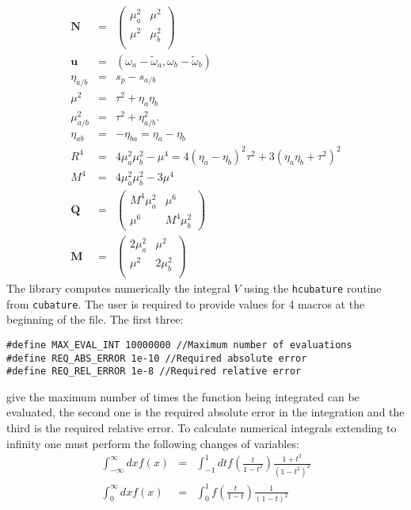 \documentclass[10pt,letterpaper]{article}
\begin{document}
\begin{eqnarray}\label{Nu}
\mathbf{N}&=& \left(
\begin{array}{cc}
\mu_a^2 & \mu^2 \\
\mu^2 & \mu_b^2 \\
\end{array}
\right)\\ 
\mathbf{u}&=&(\omega_a-\tilde \omega_a,\omega_b-\tilde \omega_b) \nonumber\\
\eta _{a/b}&=&s_p-s_{a/b} \nonumber\\
\mu ^2&=&\tau ^2+\eta _a \eta _b \nonumber\\
\mu _{a/b}^2&=&\tau ^2+\eta _{a/b}^2. \nonumber\\
\eta_{ab} &=&-\eta_{ba}=\eta _a-\eta _b \nonumber\\
R^4&=&4 \mu_a^2 \mu_b^2-\mu^4=4(\eta_a-\eta_b)^2 \tau^2+3 (\eta_a \eta_b+\tau^2)^2 \nonumber\\
M^4&=&4 \mu_a^2 \mu_b^2-3\mu^4\nonumber\\
\mathbf{Q}&=&
\left(
\begin{array}{cc}
M^4 \mu _a^2 & \mu ^6 \\
\mu ^6 & M^4 \mu _b^2
\end{array}
\right)\\
\mathbf{M}&=&
\left(
\begin{array}{cc}
2  \mu _a^2 &  \mu ^2  \\
 \mu ^2  & 2  \mu _b^2 \\
\end{array}
\right)
\end{eqnarray}
The library computes numerically the integral $V$ using the \verb|hcubature| routine from \verb|cubature|.
The user is required to provide values for 4 macros at the beginning of the file. The first three:
\begin{verbatim}
#define MAX_EVAL_INT 10000000 //Maximum number of evaluations
#define REQ_ABS_ERROR 1e-10 //Required absolute error
#define REQ_REL_ERROR 1e-8 //Required relative error   
\end{verbatim}
give the maximum number of times the function being integrated can be evaluated, the second one is the required absolute error in the integration and the third is the required relative error. 
To calculate numerical integrals extending to infinity one must perform the following changes of variables:
\begin{eqnarray}\label{cv}
\int_{-\infty}^\infty dx f(x)&=&\int_{-1}^1 dt f\left(\frac{t}{1-t^2}\right) \frac{1+t^2}{(1-t^2)^2}\\
\int_{0}^{\infty} dx f(x) &=& \int_0^1 f\left(\frac{t}{1-t} \right) \frac{1}{(1-t)^2}\nonumber
\end{eqnarray}
\end{document}
